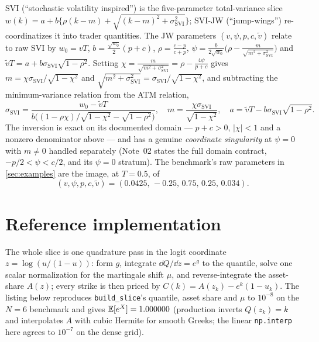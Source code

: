\documentclass[11pt]{article}
\begin{document}
SVI (``stochastic volatility inspired'') is the five-parameter total-variance
slice $w(k)=a+b\{\rho(k-m)+\sqrt{(k-m)^2+\sigma_{\mathrm{SVI}}^2}\}$; SVI-JW
(``jump-wings'') re-coordinatizes it into trader quantities. The JW parameters
$(v,\psi,p,c,\widetilde v)$ relate to raw SVI by
$w_0=vT$, $b=\tfrac{\sqrt{w_0}}{2}(p+c)$, $\rho=\tfrac{c-p}{c+p}$,
$\psi=\tfrac{b}{2\sqrt{w_0}}\big(\rho-\tfrac{m}{\sqrt{m^2+\sigma_{\mathrm{SVI}}^2}}\big)$ and
$\widetilde vT=a+b\sigma_{\mathrm{SVI}}\sqrt{1-\rho^2}$. Setting
$\chi=\tfrac{m}{\sqrt{m^2+\sigma_{\mathrm{SVI}}^2}}=\rho-\tfrac{4\psi}{p+c}$ gives
$m=\chi\sigma_{\mathrm{SVI}}/\sqrt{1-\chi^2}$ and
$\sqrt{m^2+\sigma_{\mathrm{SVI}}^2}=\sigma_{\mathrm{SVI}}/\sqrt{1-\chi^2}$,
and subtracting the minimum-variance relation from the ATM relation,
\begin{equation}
\sigma_{\mathrm{SVI}}=\frac{w_0-\widetilde vT}{b\big((1-\rho\chi)/\sqrt{1-\chi^2}-\sqrt{1-\rho^2}\big)},
\quad m=\frac{\chi\sigma_{\mathrm{SVI}}}{\sqrt{1-\chi^2}},
\quad a=\widetilde vT-b\sigma_{\mathrm{SVI}}\sqrt{1-\rho^2}.
\end{equation}
The inversion is exact on its documented domain --- $p+c>0$, $|\chi|<1$ and a
nonzero denominator above --- and has a genuine \emph{coordinate singularity}
at $\psi=0$ with $m\ne0$ handled separately (Note~02 states the full domain
contract, $-p/2<\psi<c/2$, and its $\psi=0$ stratum). The benchmark's raw
parameters in \cref{sec:examples} are the image, at $T=0.5$, of
\[
(v,\psi,p,c,\widetilde v)=(0.0425,\,-0.25,\,0.75,\,0.25,\,0.034).
\]

\section{Reference implementation}
\label{app:ref}

The whole slice is one quadrature pass in the logit coordinate $z=\log(u/(1-u))$:
form $g$, integrate $\dd Q/\dd z=e^{g}$ to the quantile, solve one scalar
normalization for the martingale shift $\mu$, and reverse-integrate the
asset-share $A(z)$; every strike is then priced by $C(k)=A(z_k)-e^k(1-u_k)$. The
listing below reproduces \texttt{build\_slice}'s quantile, asset share and $\mu$ to
$10^{-8}$ on the $N=6$ benchmark and gives $\mathbb{E}[e^X]=1.000000$ (production inverts
$Q(z_k)=k$ and interpolates $A$ with cubic Hermite for smooth Greeks; the linear
\texttt{np.interp} here agrees to $10^{-7}$ on the dense grid).
\end{document}
